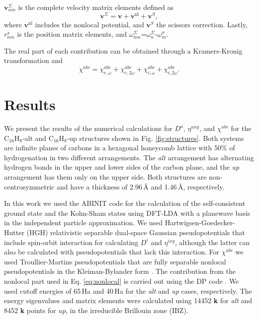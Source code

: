 \documentclass[pss]{wiley2sp} %
\begin{document}
$\mathbf{v}^{\Sigma}_{nm}$ is the complete velocity matrix elements defined as
\begin{equation}\label{eq:nonlocal}
\mathbf{v}^{\Sigma}=\mathbf{v}+\mathbf{v}^{\mathrm{nl}}+\mathbf{v}^{S},
\end{equation}
where $\mathbf{v}^{\mathrm{nl}}$ includes the nonlocal potential, and
$\mathbf{v}^{S}$ the scissors correction. Lastly, $r^{\mathrm{a}}_{nm}$ is the
position matrix elements, and
$\omega^\Sigma_{nm}$=$\omega^{\Sigma}_{n}$-$\omega^{\sigma}_{m}$.

The real part of each contribution can be obtained through a Kramers-Kronig
transformation \cite{tancogne2014effect} and
\begin{equation*}\label{eq:chitotal}
    \chi^{abc} = \chi^{abc}_{e,\omega} + \chi^{abc}_{e,2\omega} +
    \chi^{abc}_{i,\omega} + \chi^{abc}_{i,2\omega}
    .
\end{equation*}

\section{Results}\label{sec:results}

We present the results of the numerical calculations for {$D^{a}$}, {$\eta^{axy}$}, and $\chi^{abc}$ for the C$_{16}$H$_{8}$-alt and C$_{16}$H$_{8}$-up structures shown in Fig. \ref{fig:structures}. Both systems are infinite planes of carbons in a hexagonal honeycomb lattice with 50\% of hydrogenation in two different arrangements. The \emph{alt} arrangement has alternating hydrogen bonds in the upper and lower sides of the carbon plane, and the \emph{up} arrangement has them only on the upper side. Both structures are non-centrosymmetric and have a thickness of 2.96\,{\AA} and 1.46\,{\AA}, respectively. 

In this work we used the ABINIT code \cite{torrent2008implementation} for the calculation of the self-consistent ground state and the Kohn-Sham states using DFT-LDA with a planewave basis in the independent particle approximation. We used Hartwigsen-Goedecker-Hutter (HGH) relativistic separable dual-space Gaussian pseudopotentials \cite{hartwigsen1998relativistic} that include spin-orbit interaction for calculating $D^{i}$ and {$\eta^{ixy}$}, although the latter can also be calculated with pseudopotentials that lack this interaction. For $\chi^{abc}$ we used Troullier-Martins pseudopotentials \cite{troullier1991efficient} that are fully separable nonlocal pseudopotentials in the Kleiman-Bylander form \cite{kleinman1982efficacious}. The contribution from the nonlocal part used in Eq. \eqref{eq:nonlocal} is carried out using the DP code \cite{olevanoDP}. We used cutoff energies of 65\,Ha and 40\,Ha for the \emph{alt} and \emph{up} cases, respectively. The energy eigenvalues and matrix elements were calculated using 14452 \textbf{k} for \emph{alt} and 8452 \textbf{k} points for \emph{up}, in the irreducible Brillouin zone (IBZ).
\end{document}
